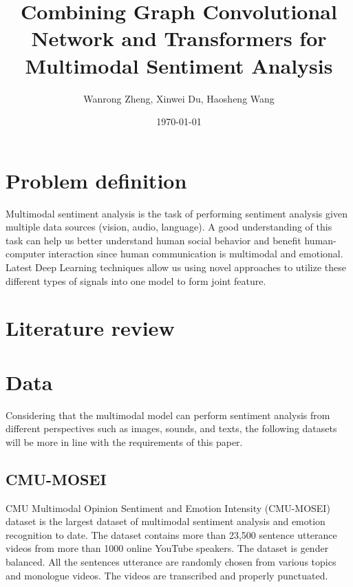 \documentclass[11pt]{article}
\title{Combining Graph Convolutional Network and Transformers for Multimodal Sentiment Analysis}
\author{
  Wanrong Zheng,
  Xinwei Du,
  Haosheng Wang
  }
\date{\today}
\begin{document}
\maketitle

\section{Problem definition}
Multimodal sentiment analysis is the task of performing sentiment analysis given multiple data sources (vision, audio, language).
A good understanding of this task can help us better understand human social behavior and benefit human-computer interaction since human communication is multimodal and emotional.
Latest Deep Learning techniques allow us using novel approaches to utilize these different types of signals into one model to form joint feature.  


\section{Literature review}

\section{Data}

Considering that the multimodal model can perform sentiment analysis from different perspectives such as images, sounds, and texts, the following datasets will be more in line with the requirements of this paper.

\subsection{CMU-MOSEI}
CMU Multimodal Opinion Sentiment and Emotion Intensity (CMU-MOSEI) dataset is the largest dataset of multimodal sentiment analysis and emotion recognition to date. The dataset contains more than 23,500 sentence utterance videos from more than 1000 online YouTube speakers. The dataset is gender balanced. All the sentences utterance are randomly chosen from various topics and monologue videos. The videos are transcribed and properly punctuated.
\end{document}
